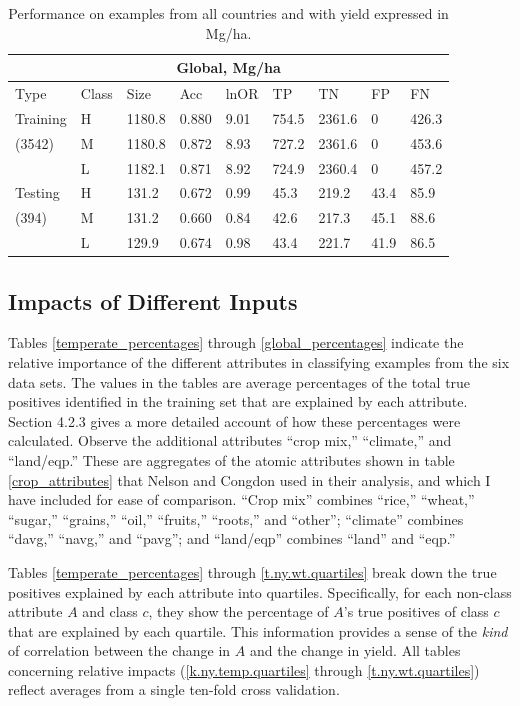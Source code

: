 \documentclass[12pt,twoside]{article}
\begin{document}
\begin{table}[h!]
\centering
\begin{tabular}{lllllllll}
\toprule
\multicolumn{9}{c}{\textbf{Global, Mg/ha}} \\
\midrule
Type & Class & Size & Acc & lnOR & TP & TN & FP & FN \\
\midrule
Training & H & 1180.8 & 0.880 & 9.01 & 754.5 & 2361.6 & 0 & 426.3  \\
(3542) & M & 1180.8 & 0.872 & 8.93 & 727.2 & 2361.6 & 0 & 453.6  \\
& L & 1182.1 & 0.871 & 8.92 & 724.9 & 2360.4 & 0 & 457.2  \\
Testing & H & 131.2 & 0.672 & 0.99 & 45.3 & 219.2 & 43.4 & 85.9 \\
(394) & M & 131.2 & 0.660 & 0.84 & 42.6 & 217.3 & 45.1 & 88.6 \\
& L & 129.9 & 0.674 & 0.98 & 43.4 & 221.7 & 41.9 & 86.5 \\
\bottomrule
\end{tabular}
\captionsetup{width=.85\textwidth}
\caption[Performance on Global Data with Yield in Mg/ha]{Performance on examples from all countries and with yield expressed in Mg/ha.}
\label{t.ny.wt_results}
\end{table}

\subsection{Impacts of Different Inputs}
Tables \ref{temperate_percentages} through \ref{global_percentages} indicate the relative importance of the different attributes in classifying examples from the six data sets. The values in the tables are average percentages of the total true positives identified in the training set that are explained by each attribute. Section 4.2.3 gives a more detailed account of how these percentages were calculated. Observe the additional attributes ``crop mix,'' ``climate,'' and ``land/eqp.'' These are aggregates of the atomic attributes shown in table \ref{crop_attributes} that Nelson and Congdon used in their analysis, and which I have included for ease of comparison. ``Crop mix'' combines ``rice,'' ``wheat,'' ``sugar,'' ``grains,'' ``oil,'' ``fruits,'' ``roots,'' and ``other''; ``climate'' combines ``davg,'' ``navg,'' and ``pavg''; and ``land/eqp'' combines ``land'' and ``eqp.'' 

Tables \ref{temperate_percentages} through \ref{t.ny.wt.quartiles} break down the true positives explained by each attribute into quartiles. Specifically, for each non-class attribute $A$ and class $c$, they show the percentage of $A$'s true positives of class $c$ that are explained by each quartile. This information provides a sense of the \emph{kind} of correlation between the change in $A$ and the change in yield. All tables concerning relative impacts (\ref{k.ny.temp.quartiles} through \ref{t.ny.wt.quartiles}) reflect averages from a single ten-fold cross validation.
\end{document}
